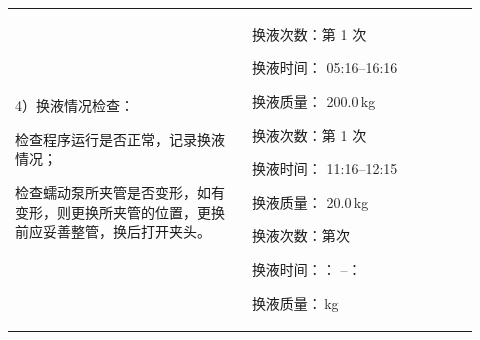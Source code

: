 \documentclass[UTF8,10pt,a4paper,fontset=fandol]{ctexart}
\newcommand{\fieldvalue}[1]{#1}
\newcommand{\handwritten}[1]{#1}
\begin{document}
\noindent
\begin{tabular}{|p{0.47\linewidth}|p{0.45\linewidth}|}
\hline
\begin{minipage}[t]{0.43\linewidth}
\vspace{0.2em}

4）换液情况检查：

检查程序运行是否正常，记录换液情况；

检查蠕动泵所夹管是否变形，如有变形，则更换所夹管的位置，更换前应妥善整管，换后打开夹头。

\vspace{1em}
\end{minipage}
&
\begin{minipage}[t]{0.41\linewidth}
换液次数：第
\fieldvalue{\handwritten{1}}
次

换液时间：
\fieldvalue{\handwritten{05:16--16:16}}

换液质量：
\fieldvalue{\handwritten{200.0}}\,kg

\vspace{0.8em}

换液次数：第
\fieldvalue{\handwritten{1}}
次

换液时间：
\fieldvalue{\handwritten{11:16--12:15}}

换液质量：
\fieldvalue{\handwritten{20.0}}\,kg

\vspace{0.8em}

换液次数：第\underline{\hspace{1.5em}}次

换液时间：\underline{\hspace{1.5em}}：
\underline{\hspace{1.5em}}--\underline{\hspace{1.5em}}：
\underline{\hspace{1.5em}}

换液质量：\underline{\hspace{2em}}\,kg

\vspace{0.8em}


\end{minipage}
\end{tabular}
\end{document}
